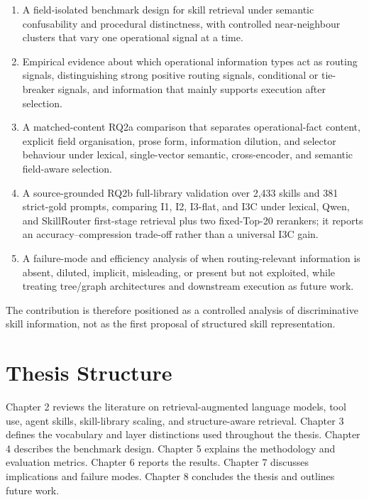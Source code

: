 \begin{enumerate}
  \item A field-isolated benchmark design for skill retrieval under semantic confusability and procedural distinctness, with controlled near-neighbour clusters that vary one operational signal at a time.
  \item Empirical evidence about which operational information types act as routing signals, distinguishing strong positive routing signals, conditional or tie-breaker signals, and information that mainly supports execution after selection.
  \item A matched-content RQ2a comparison that separates operational-fact content, explicit field organisation, prose form, information dilution, and selector behaviour under lexical, single-vector semantic, cross-encoder, and semantic field-aware selection.
  \item A source-grounded RQ2b full-library validation over 2,433 skills and 381 strict-gold prompts, comparing I1, I2, I3-flat, and I3C under lexical, Qwen, and SkillRouter first-stage retrieval plus two fixed-Top-20 rerankers; it reports an accuracy--compression trade-off rather than a universal I3C gain.
  \item A failure-mode and efficiency analysis of when routing-relevant information is absent, diluted, implicit, misleading, or present but not exploited, while treating tree/graph architectures and downstream execution as future work.
\end{enumerate}

The contribution is therefore positioned as a controlled analysis of discriminative skill information, not as the first proposal of structured skill representation.

\section{Thesis Structure}

Chapter 2 reviews the literature on retrieval-augmented language models, tool use, agent skills, skill-library scaling, and structure-aware retrieval. Chapter 3 defines the vocabulary and layer distinctions used throughout the thesis. Chapter 4 describes the benchmark design. Chapter 5 explains the methodology and evaluation metrics. Chapter 6 reports the results. Chapter 7 discusses implications and failure modes. Chapter 8 concludes the thesis and outlines future work.
